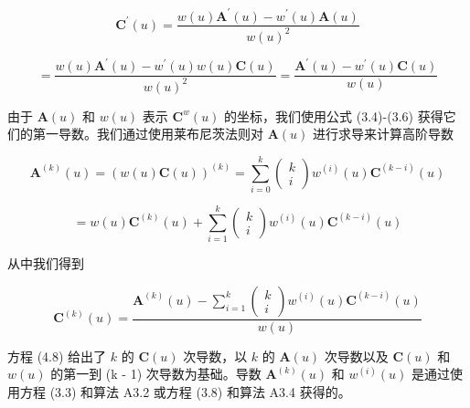 \documentclass[../main.tex]{subfiles}
\begin{document}
\[
{\mathbf{C}}^{\prime }\left( u\right)  = \frac{w\left( u\right) {\mathbf{A}}^{\prime }\left( u\right)  - {w}^{\prime }\left( u\right) \mathbf{A}\left( u\right) }{w{\left( u\right) }^{2}}
\]

\[
= \frac{w\left( u\right) {\mathbf{A}}^{\prime }\left( u\right)  - {w}^{\prime }\left( u\right) w\left( u\right) \mathbf{C}\left( u\right) }{w{\left( u\right) }^{2}} = \frac{{\mathbf{A}}^{\prime }\left( u\right)  - {w}^{\prime }\left( u\right) \mathbf{C}\left( u\right) }{w\left( u\right) } \tag{4.7}
\]

由于 \(\mathbf{A}\left( u\right)\) 和 \(w\left( u\right)\) 表示 \({\mathbf{C}}^{w}\left( u\right)\) 的坐标，我们使用公式 (3.4)-(3.6) 获得它们的第一导数。我们通过使用莱布尼茨法则对 \(\mathbf{A}\left( u\right)\) 进行求导来计算高阶导数

\[
{\mathbf{A}}^{\left( k\right) }\left( u\right)  = {\left( w\left( u\right) \mathbf{C}\left( u\right) \right) }^{\left( k\right) } = \mathop{\sum }\limits_{{i = 0}}^{k}\left( \begin{matrix} k \\  i \end{matrix}\right) {w}^{\left( i\right) }\left( u\right) {\mathbf{C}}^{\left( k - i\right) }\left( u\right)
\]

\[
= w\left( u\right) {\mathbf{C}}^{\left( k\right) }\left( u\right)  + \mathop{\sum }\limits_{{i = 1}}^{k}\left( \begin{matrix} k \\  i \end{matrix}\right) {w}^{\left( i\right) }\left( u\right) {\mathbf{C}}^{\left( k - i\right) }\left( u\right)
\]

从中我们得到

\[
{\mathbf{C}}^{\left( k\right) }\left( u\right)  = \frac{{\mathbf{A}}^{\left( k\right) }\left( u\right)  - \mathop{\sum }\limits_{{i = 1}}^{k}\left( \begin{matrix} k \\  i \end{matrix}\right) {w}^{\left( i\right) }\left( u\right) {\mathbf{C}}^{\left( k - i\right) }\left( u\right) }{w\left( u\right) } \tag{4.8}
\]

方程 (4.8) 给出了 \(k\) 的 \(\mathbf{C}\left( u\right)\) 次导数，以 \(k\) 的 \(\mathbf{A}\left( u\right)\) 次导数以及 \(\mathbf{C}\left( u\right)\) 和 \(w\left( u\right)\) 的第一到 (k - 1) 次导数为基础。导数 \({\mathbf{A}}^{\left( k\right) }\left( u\right)\) 和 \({w}^{\left( i\right) }\left( u\right)\) 是通过使用方程 (3.3) 和算法 A3.2 或方程 (3.8) 和算法 A3.4 获得的。
\end{document}
